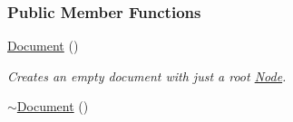 \subsubsection*{Public Member Functions}
\begin{DoxyCompactItemize}
\item 
\hypertarget{classMezzanine_1_1xml_1_1Document_a1716a5eb0eac567f6f6286439bf03108}{
\hyperlink{classMezzanine_1_1xml_1_1Document_a1716a5eb0eac567f6f6286439bf03108}{Document} ()}
\label{classMezzanine_1_1xml_1_1Document_a1716a5eb0eac567f6f6286439bf03108}

\begin{DoxyCompactList}\small\item\em Creates an empty document with just a root \hyperlink{classMezzanine_1_1xml_1_1Node}{Node}. \item\end{DoxyCompactList}\item 
\hypertarget{classMezzanine_1_1xml_1_1Document_afe42a33a19c517573d56b0a89c27038f}{
\hyperlink{classMezzanine_1_1xml_1_1Document_afe42a33a19c517573d56b0a89c27038f}{$\sim$Document} ()}
\label{classMezzanine_1_1xml_1_1Document_afe42a33a19c517573d56b0a89c27038f}


\end{DoxyCompactItemize}

